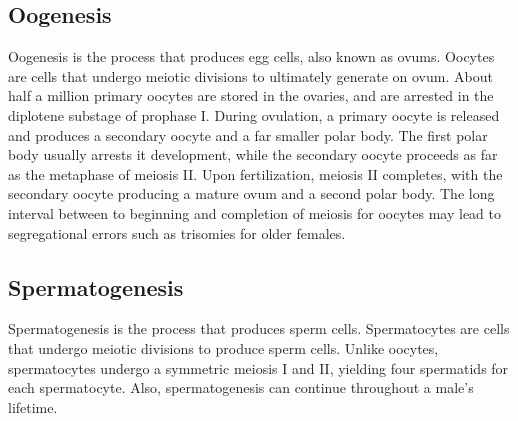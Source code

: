 \documentclass[12pt,titlepage]{article}
\begin{document}
      \subsection{Oogenesis}
        Oogenesis is the process that produces egg cells, also known as ovums. Oocytes are cells that undergo meiotic divisions to ultimately generate on ovum. About half
        a million primary oocytes are stored in the ovaries, and are arrested in the diplotene substage of prophase I. During ovulation, a primary oocyte is released and
        produces a secondary oocyte and a far smaller polar body. The first polar body usually arrests it development, while the secondary oocyte proceeds as far as the
        metaphase of meiosis II. Upon fertilization, meiosis II completes, with the secondary oocyte producing a mature ovum and a second polar body. The long interval
        between to beginning and completion of meiosis for oocytes may lead to segregational errors such as trisomies for older females.

      \subsection{Spermatogenesis}
        Spermatogenesis is the process that produces sperm cells. Spermatocytes are cells that undergo meiotic divisions to produce sperm cells. Unlike oocytes,
        spermatocytes undergo a symmetric meiosis I and II, yielding four spermatids for each spermatocyte. Also, spermatogenesis can continue throughout a male's lifetime.
\end{document}
